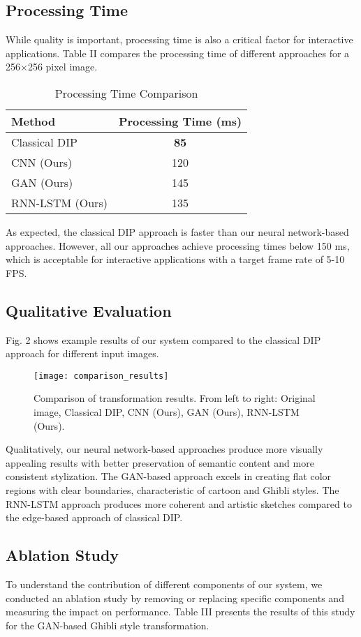 \documentclass[conference]{IEEEtran}
\begin{document}
\subsection{Processing Time}
While quality is important, processing time is also a critical factor for interactive applications. Table II compares the processing time of different approaches for a 256×256 pixel image.

\begin{table}[!t]
\caption{Processing Time Comparison}
\label{table_time}
\centering
\begin{tabular}{lc}
\toprule
\textbf{Method} & \textbf{Processing Time (ms)} \\
\midrule
Classical DIP & \textbf{85} \\
CNN (Ours) & 120 \\
GAN (Ours) & 145 \\
RNN-LSTM (Ours) & 135 \\
\bottomrule
\end{tabular}
\end{table}

As expected, the classical DIP approach is faster than our neural network-based approaches. However, all our approaches achieve processing times below 150 ms, which is acceptable for interactive applications with a target frame rate of 5-10 FPS.

\subsection{Qualitative Evaluation}
Fig. 2 shows example results of our system compared to the classical DIP approach for different input images.

\begin{figure}[!t]
\centering
\texttt{[image: comparison\_results]}
\caption{Comparison of transformation results. From left to right: Original image, Classical DIP, CNN (Ours), GAN (Ours), RNN-LSTM (Ours).}
\label{fig_comparison}
\end{figure}

Qualitatively, our neural network-based approaches produce more visually appealing results with better preservation of semantic content and more consistent stylization. The GAN-based approach excels in creating flat color regions with clear boundaries, characteristic of cartoon and Ghibli styles. The RNN-LSTM approach produces more coherent and artistic sketches compared to the edge-based approach of classical DIP.

\subsection{Ablation Study}
To understand the contribution of different components of our system, we conducted an ablation study by removing or replacing specific components and measuring the impact on performance. Table III presents the results of this study for the GAN-based Ghibli style transformation.
\end{document}
